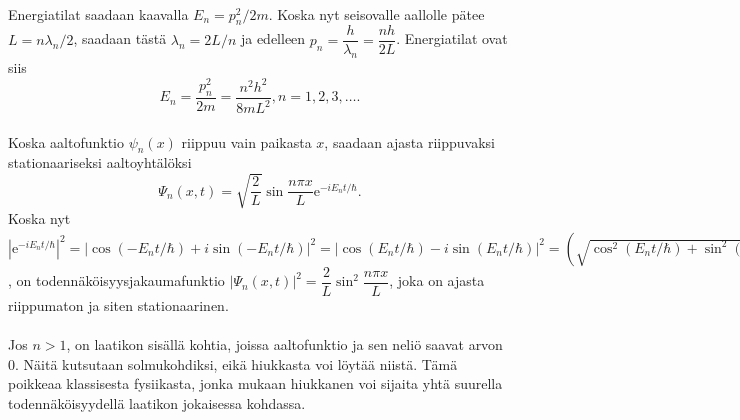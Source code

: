 \documentclass{article}
\begin{document}
 \\
Energiatilat saadaan kaavalla \(E_n=p_n ^2/2m\). Koska nyt seisovalle aallolle pätee \(L=n\lambda _n /2\), saadaan tästä \(\lambda _n = 2L/n\) ja edelleen \(p_n=\dfrac{h}{\lambda _n}=\dfrac{nh}{2L}\). Energiatilat ovat siis $$E_n=\dfrac{p_n^2}{2m}=\dfrac{n^2 h^2}{8mL^2}, n=1, 2, 3, \ldots .$$
 \\
Koska aaltofunktio \(\psi _n(x)\) riippuu vain paikasta \(x\), saadaan ajasta riippuvaksi stationaariseksi aaltoyhtälöksi $$\Psi _n (x, t)=\sqrt{\dfrac{2}{L}}\sin \dfrac{n\pi x}{L} \text{e}^{-iE_n t/\hbar}.$$ Koska nyt \(|\text{e}^{-iE_n t/\hbar}|^2 =|\cos (-E_n t/\hbar )+i\sin (-E_n t/\hbar) |^2=|\cos (E_n t/ \hbar)-i\sin (E_n t/\hbar)|^2=\left (\sqrt{\cos ^2 (E_n t/ \hbar)+\sin ^2 (E_n t/ \hbar)}\right )^2=1\), on todennäköisyysjakaumafunktio \(|\Psi _n (x, t)|^2=\dfrac{2}{L} \sin ^2\dfrac{n\pi x}{L}\), joka on ajasta riippumaton ja siten stationaarinen.\\
 \\
Jos \(n>1\), on laatikon sisällä kohtia, joissa aaltofunktio ja sen neliö saavat arvon 0. Näitä kutsutaan solmukohdiksi, eikä hiukkasta voi löytää niistä. Tämä poikkeaa klassisesta fysiikasta, jonka mukaan hiukkanen voi sijaita yhtä suurella todennäköisyydellä laatikon jokaisessa kohdassa.
\newpage
\end{document}
